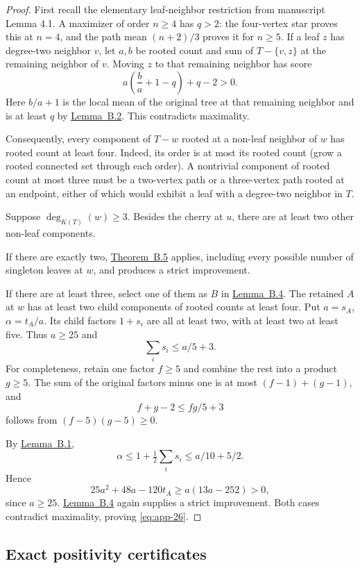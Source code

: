 \documentclass[11pt,letterpaper]{article}
\theoremstyle{plain}
\begin{document}
\begin{proof} First recall the elementary leaf-neighbor restriction from manuscript Lemma 4.1. A maximizer of order \(n\ge4\) has \(q>2\): the four-vertex star proves this at \(n=4\), and the path mean \((n+2)/3\) proves it for \(n\ge5\). If a leaf \(z\) has degree-two neighbor \(v\), let \(a,b\) be rooted count and sum of \(T-\{v,z\}\) at the remaining neighbor of \(v\). Moving \(z\) to that remaining neighbor has score \[
a\left(\frac ba+1-q\right)+q-2>0.
\] Here \(b/a+1\) is the local mean of the original tree at that remaining neighbor and is at least \(q\) by \hyperref[lem:app-2]{Lemma~B.2}. This contradicts maximality.

Consequently, every component of \(T-w\) rooted at a non-leaf neighbor of \(w\) has rooted count at least four. Indeed, its order is at most its rooted count (grow a rooted connected set through each order). A nontrivial component of rooted count at most three must be a two-vertex path or a three-vertex path rooted at an endpoint, either of which would exhibit a leaf with a degree-two neighbor in \(T\).

Suppose \(\deg_{K(T)}(w)\ge3\). Besides the cherry at \(u\), there are at least two other non-leaf components.

If there are exactly two, \hyperref[thm:app-5]{Theorem~B.5} applies, including every possible number of singleton leaves at \(w\), and produces a strict improvement.

If there are at least three, select one of them as \(B\) in \hyperref[lem:app-4]{Lemma~B.4}. The retained \(A\) at \(w\) has at least two child components of rooted counts at least four. Put \(a=s_A\), \(\alpha=t_A/a\). Its child factors \(1+s_i\) are all at least two, with at least two at least five. Thus \(a\ge25\) and \[
\sum_i s_i\le a/5+3.
\] For completeness, retain one factor \(f\ge5\) and combine the rest into a product \(g\ge5\). The sum of the original factors minus one is at most \((f-1)+(g-1)\), and \[
f+g-2\le fg/5+3
\] follows from \((f-5)(g-5)\ge0\).

By \hyperref[lem:app-1]{Lemma~B.1}, \[
\alpha\le1+\tfrac12\sum_i s_i\le a/10+5/2.
\] Hence \[
25a^2+48a-120t_A
\ge a(13a-252)>0,
\] since \(a\ge25\). \hyperref[lem:app-4]{Lemma~B.4} again supplies a strict improvement. Both cases contradict maximality, proving \eqref{eq:app-26}. \end{proof}

\subsection{Exact positivity certificates}\label{app:cherry-certificates}
\end{document}
